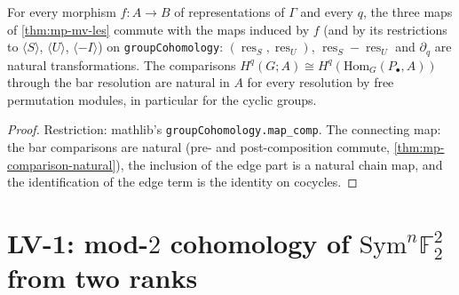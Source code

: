 \begin{theorem}\label{thm:mp-mv-natural}
  \leanok
  For every morphism $f\colon A\to B$ of representations of $\Gamma$ and every $q$, the three maps of \ref{thm:mp-mv-les} commute
  with the maps induced by $f$ (and by its restrictions to $\langle S\rangle$, $\langle U\rangle$, $\langle-I\rangle$) on
  \texttt{groupCohomology}: $(\operatorname{res}_S,\operatorname{res}_U)$, $\operatorname{res}_S-\operatorname{res}_U$ and $\partial_q$
  are natural transformations.  The comparisons $H^q(G;A)\cong H^q(\mathrm{Hom}_G(P_\bullet,A))$ through the bar resolution
  are natural in $A$ for every resolution by free permutation modules, in particular for the cyclic groups.
\end{theorem}
\begin{proof}
  \leanok
  Restriction: mathlib's \texttt{groupCohomology.map\_comp}.  The connecting map: the bar comparisons are natural (pre- and
  post-composition commute, \ref{thm:mp-comparison-natural}), the inclusion of the edge part is a natural chain map, and the
  identification of the edge term is the identity on cocycles.
\end{proof}

\section{LV-1: mod-$2$ cohomology of $\mathrm{Sym}^n\mathbb F_2^2$ from two ranks}

